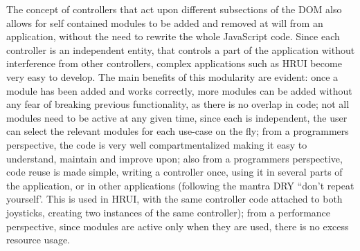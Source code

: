 The concept of controllers that act upon different subsections of the DOM also allows for self contained modules to be added and removed at will from an application, without the need to rewrite the whole JavaScript code. Since each controller is an independent entity, that controls a part of the application without interference from other controllers, complex applications such as HRUI become very easy to develop. The main benefits of this modularity are evident: once a module has been added and works correctly, more modules can be added without any fear of breaking previous functionality, as there is no overlap in code; not all modules need to be active at any given time, since each is independent, the user can select the relevant modules for each use-case on the fly; from a programmers perspective, the code is very well compartmentalized making it easy to understand, maintain and improve upon; also from a programmers perspective, code reuse is made simple, writing a controller once, using it in several parts of the application, or in other applications (following the mantra DRY ``don't repeat yourself'. This is used in HRUI, with the same controller code attached to both joysticks, creating two instances of the same controller); from a performance perspective, since modules are active only when they are used, there is no excess resource usage.\\

